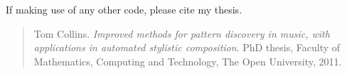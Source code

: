 \noindent If making use of any other code, please cite my thesis.

\begin{quotation}
\noindent Tom Collins. \emph{Improved methods for pattern discovery in music, with applications in automated stylistic composition}. PhD thesis, Faculty of Mathematics, Computing and Technology, The Open University, 2011.
\end{quotation}

